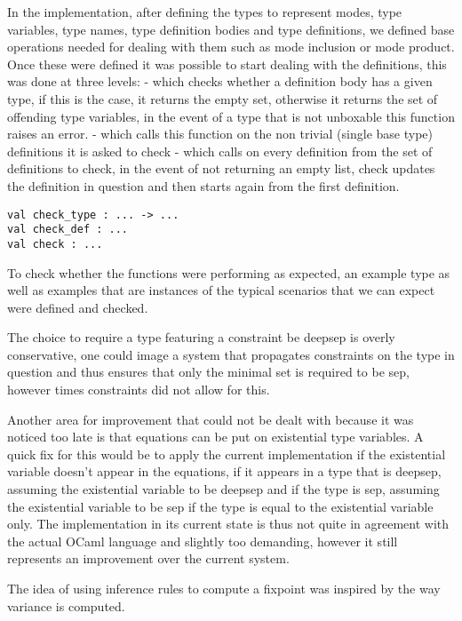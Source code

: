 \documentclass[a4]{article}
\begin{document}
In the implementation, after defining the types to represent modes, type variables, type names, type definition bodies and type definitions, we defined base operations needed for dealing with them such as mode inclusion or mode product. Once these were defined it was possible to start dealing with the definitions, this was done at three levels:
-  which checks whether a definition body has a given type, if this is the case, it returns the empty set, otherwise it returns the set of offending type variables, in the event of a type that is not unboxable this function raises an error.
-  which calls this function on the non trivial (single base type) definitions it is asked to check
-  which calls  on every definition from the set of definitions to check, in the event of  not returning an empty list, check updates the definition in question and then starts again from the first definition.

\begin{lstlisting}
val check_type : ... -> ...
val check_def : ...
val check : ...  
\end{lstlisting}

To check whether the functions were performing as expected, an example type as well as examples that are instances of the typical scenarios that we can expect were defined and checked.

The choice to require a type featuring a constraint be deepsep is overly conservative, one could image a system that propagates constraints on the type in question and thus ensures that only the minimal set is required to be sep, however times constraints did not allow for this.


Another area for improvement that could not be dealt with because it was noticed too late is that equations can be put on existential type variables. A quick fix for this would be to apply the current implementation if the existential variable doesn't appear in the equations, if it appears in a type that is deepsep, assuming the existential variable to be deepsep and if the type is sep, assuming the existential variable to be sep if the type is equal to the existential variable only. The implementation in its current state is thus not quite in agreement with the actual OCaml language and slightly too demanding, however it still represents an improvement over the current system.

The idea of using inference rules to compute a fixpoint was inspired by the way variance is computed. 
\end{document}
